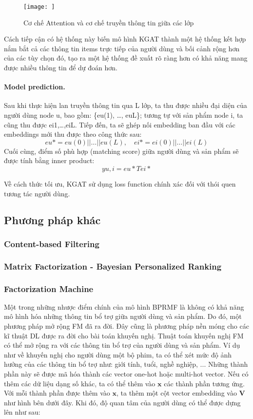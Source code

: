 \begin{figure}[h]
    \centering
    \texttt{[image: ]}
    \caption{Cơ chế Attention và cơ chế truyền thông tin giữa các lớp}
    \label{fig:attention_process}
\end{figure}

Cách tiếp cận có hệ thống này biến mô hình KGAT thành một hệ thống kết hợp nắm bắt cả các thông tin items trực tiếp của người dùng và bối cảnh rộng hơn của các tùy chọn đó, tạo ra một hệ thống đề xuất rõ ràng hơn có khả năng mang được nhiều thông tin để dự đoán hơn.

\paragraph{Model prediction.}
Sau khi thực hiện lan truyền thông tin qua L lớp, ta thu được nhiều đại diện của người dùng node u, bao gồm: \{eu(1), …, euL\}; tương tự với sản phẩm node i, ta cũng thu được ei1,…,eiL. Tiếp đến, ta sẽ ghép nối embedding ban đầu với các embeddings mới thu được theo công thức sau:
\[
eu* = eu(0) || … || eu(L), \quad ei* = ei(0) || … || ei(L)
\]
Cuối cùng, điểm số phù hợp (matching score) giữa người dùng và sản phẩm sẽ được tính bằng inner product:
\[
yu,i = eu*T e i*
\]

Về cách thức tối ưu, KGAT sử dụng loss function chính xác đối với thói quen tương tác người dùng.



\subsection{Phương pháp khác}
\subsubsection{Content-based Filtering}
\subsubsection{Matrix Factorization - Bayesian Personalized Ranking}
\subsubsection{Factorization Machine}
Một trong những nhược điểm chính của mô hình BPRMF là không có khả năng mô hình hóa 
những thông tin bổ trợ giữa người dùng và sản phẩm. Do đó, một phương pháp mở rộng FM đã ra đời. 
Đây cũng là phương pháp nền móng cho các kĩ thuật DL được ra đời cho bài toán khuyến nghị.
\newline
\indent Thuật toán khuyến nghị FM có thể mở rộng ra với các thông tin bổ trợ của người dùng và sản phẩm. 
Ví dụ như về khuyến nghị cho người dùng một bộ phim, ta có thể xét mức độ ảnh hưởng của 
các thông tin bổ trợ như: giới tính, tuổi, nghề nghiệp, ... Những thành phần này sẽ được mã hóa 
thành các vector one-hot hoặc multi-hot vector. Nếu có thêm các dữ liệu dạng số khác, 
ta có thể thêm vào $\mathbf{x}$ các thành phần tương ứng. Với mỗi thành phần được thêm vào 
$\mathbf{x}$, ta thêm một cột vector embedding vào $\mathbf{V}$ như hình bên dưới đây.
Khi đó, độ quan tâm của người dùng có thể được dựng lên như sau:

